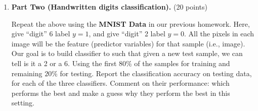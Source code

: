 \documentclass[twoside,12pt]{article}
\begin{document}
\begin{enumerate}
\begin{enumerate}
\item \textbf{Part Two (Handwritten digits classification).} (20 points) 



Repeat the above using the \textbf{MNIST Data} in our previous homework. Here, give ``digit'' 6 label $y = 1$, and give ``digit'' 2 label $y = 0$. All the pixels in each image will be the feature (predictor variables) for that sample (i.e., image). Our goal is to build classifier to such that given a new test sample, we can tell is it a 2 or a 6. Using the first $80\%$ of the samples for training and remaining $20\%$ for testing. Report the classification accuracy on testing data, for each of the three classifiers. Comment on their performance: which performs the best and make a guess why they perform the best in this setting. 

\end{enumerate}




\end{enumerate}
\end{document}

